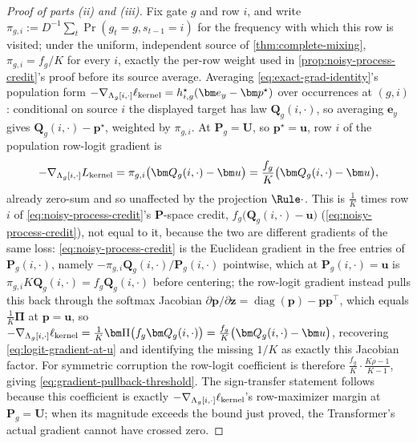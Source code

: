 \begin{proof}[Proof of parts (ii) and (iii)]
 Fix gate $g$ and row $i$, and
write $\pi_{g,i}:=D^{-1}\sum_t\Pr(g_t=g,s_{t-1}=i)$ for the frequency with
which this row is visited; under the uniform, independent source of
\cref{thm:complete-mixing}, $\pi_{g,i}=f_g/K$ for every $i$, exactly the
per-row weight used in \cref{prop:noisy-process-credit}'s proof before its
source average. Averaging \cref{eq:exact-grad-identity}'s population
form $-\nabla_{\Lambda_g[i,\cdot]}\ell_{\rm kernel}=h^\star_{i,g}(\bm e_y-\bm
p^\star)$ over occurrences at $(g,i)$: conditional on source $i$ the
displayed target has law $\bm Q_g(i,\cdot)$, so averaging $\bm e_y$ gives
$\bm Q_g(i,\cdot)-\bm p^\star$, weighted by $\pi_{g,i}$. At $\bm P_g=\bm
U$, so $\bm p^\star=\bm u$, row $i$ of the population row-logit gradient
is
\begin{equation}
 -\nabla_{\Lambda_g[i,\cdot]}L_{\rm kernel}=\pi_{g,i}\bigl(\bm Q_g(i,\cdot)-\bm u\bigr)
 =\frac{f_g}{K}\bigl(\bm Q_g(i,\cdot)-\bm u\bigr),
 \label{eq:logit-gradient-at-u}
\end{equation}
already zero-sum and so unaffected by the projection $\Rule\cdot$. This is
$\frac1K$ times row $i$ of \cref{eq:noisy-process-credit}'s $\bm P$-space
credit, $f_g\bigl(\bm Q_g(i,\cdot)-\bm u\bigr)$
(\cref{eq:noisy-process-credit}), not equal to it, because the two are
different gradients of the same loss: \cref{eq:noisy-process-credit} is
the Euclidean gradient in the free entries of $\bm P_g(i,\cdot)$, namely
$-\pi_{g,i}\bm Q_g(i,\cdot)/\bm P_g(i,\cdot)$ pointwise, which at $\bm
P_g(i,\cdot)=\bm u$ is $\pi_{g,i}K\bm Q_g(i,\cdot)=f_g\bm Q_g(i,\cdot)$
before centering; the row-logit gradient instead pulls this back through
the softmax Jacobian $\partial\bm p/\partial\bm z=\operatorname{diag}(\bm
p)-\bm p\bm p^\top$, which equals $\frac1K\bm\Pi$ at $\bm p=\bm u$, so
$-\nabla_{\Lambda_g[i,\cdot]}\ell_{\rm kernel}=\frac1K\bm\Pi\bigl(f_g\bm
Q_g(i,\cdot)\bigr)=\frac{f_g}{K}\bigl(\bm Q_g(i,\cdot)-\bm u\bigr)$,
recovering \cref{eq:logit-gradient-at-u} and identifying the missing
$1/K$ as exactly this Jacobian factor. For symmetric corruption the
row-logit coefficient is therefore $\frac{f_g}{K}\cdot\frac{K\rho-1}{K-1}$,
giving \cref{eq:gradient-pullback-threshold}. The sign-transfer statement
follows because this coefficient is exactly
$-\nabla_{\Lambda_g[i,\cdot]}\ell_{\rm kernel}$'s row-maximizer margin at
$\bm P_g=\bm U$; when its magnitude exceeds the bound just proved, the
Transformer's actual gradient cannot have crossed zero.
\end{proof}

